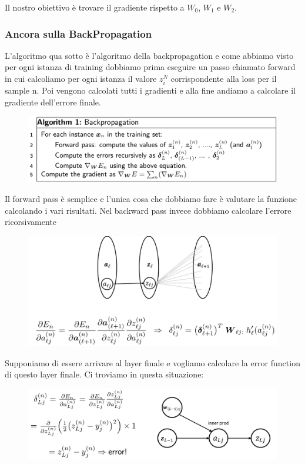 \documentclass[14pt]{extreport}
\begin{document}
Il nostro obiettivo è trovare il gradiente rispetto a $W_0$, $W_1$ e $W_2$.

\subsubsection{Ancora sulla BackPropagation}

L'algoritmo qua sotto è l'algoritmo della backpropagation e come abbiamo visto per ogni istanza di training dobbiamo prima eseguire un passo chiamato
forward in cui calcoliamo per ogni istanza il valore $z_i^N$ corrispondente alla loss per il sample n. Poi vengono calcolati tutti i gradienti e alla
fine andiamo a calcolare il gradiente dell'errore finale.

\begin{figure}[H]
	\centering
	\includegraphics[width=0.7\linewidth]{399.jpeg}
\end{figure}

Il forward pass è semplice e l'unica cosa che dobbiamo fare è valutare la funzione calcolando i vari risultati. Nel backward pass invece dobbiamo
calcolare l'errore ricorsivamente

\begin{figure}[H]
	\centering
	\includegraphics[width=0.7\linewidth]{400.jpeg}
\end{figure}

Supponiamo di essere arrivare al layer finale e vogliamo calcolare la error function di questo layer finale. Ci troviamo in questa situazione:
\begin{figure}[H]
	\centering
	\includegraphics[width=\linewidth]{401.jpeg}
\end{figure}
\end{document}
